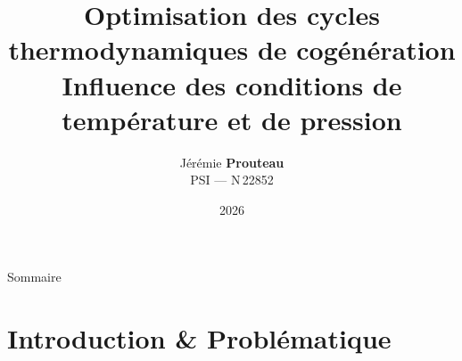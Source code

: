 \documentclass[aspectratio=43, 10pt]{beamer}
\title[Optimisation \& Cog\'en\'eration]{%
  \texorpdfstring{%
    Optimisation des cycles thermodynamiques de cog\'en\'eration \\[4pt]
    {\normalsize\normalfont
     Influence des conditions de temp\'erature et de pression}%
  }{Optimisation des cycles thermodynamiques de cogeneration}}
\author[Prouteau J. --- N\degre\,22852]{%
  \texorpdfstring{%
    J\'er\'emie \textbf{Prouteau}\\[2pt]
    \small PSI --- N\degre\,22852%
  }{Jeremie Prouteau, PSI, N22852}}
\institute{}
\date{2026}
\begin{document}

{
\begin{frame}
  \titlepage
  \vspace{-0.8em}
\end{frame}
}

\begin{frame}{Sommaire}
  \tableofcontents[subsectionstyle=hide]
\end{frame}

\section{Introduction \& Probl\'ematique}
\end{document}
